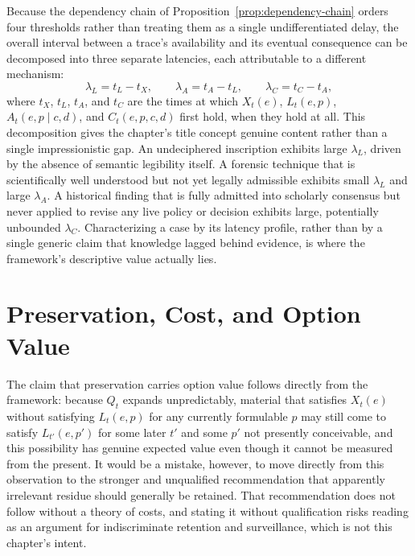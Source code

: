 Because the dependency chain of Proposition~\ref{prop:dependency-chain} orders four thresholds rather than treating them as a single undifferentiated delay, the overall interval between a trace's availability and its eventual consequence can be decomposed into three separate latencies, each attributable to a different mechanism:
\[
\lambda_L = t_L - t_X, \qquad \lambda_A = t_A - t_L, \qquad \lambda_C = t_C - t_A,
\]
where $t_X$, $t_L$, $t_A$, and $t_C$ are the times at which $X_t(e)$, $L_t(e,p)$, $A_t(e,p \mid c,d)$, and $C_t(e,p,c,d)$ first hold, when they hold at all. This decomposition gives the chapter's title concept genuine content rather than a single impressionistic gap. An undeciphered inscription exhibits large $\lambda_L$, driven by the absence of semantic legibility itself. A forensic technique that is scientifically well understood but not yet legally admissible exhibits small $\lambda_L$ and large $\lambda_A$. A historical finding that is fully admitted into scholarly consensus but never applied to revise any live policy or decision exhibits large, potentially unbounded $\lambda_C$. Characterizing a case by its latency profile, rather than by a single generic claim that knowledge lagged behind evidence, is where the framework's descriptive value actually lies.

\section{Preservation, Cost, and Option Value}

The claim that preservation carries option value follows directly from the framework: because $Q_t$ expands unpredictably, material that satisfies $X_t(e)$ without satisfying $L_t(e,p)$ for any currently formulable $p$ may still come to satisfy $L_{t'}(e,p')$ for some later $t'$ and some $p'$ not presently conceivable, and this possibility has genuine expected value even though it cannot be measured from the present. It would be a mistake, however, to move directly from this observation to the stronger and unqualified recommendation that apparently irrelevant residue should generally be retained. That recommendation does not follow without a theory of costs, and stating it without qualification risks reading as an argument for indiscriminate retention and surveillance, which is not this chapter's intent.

